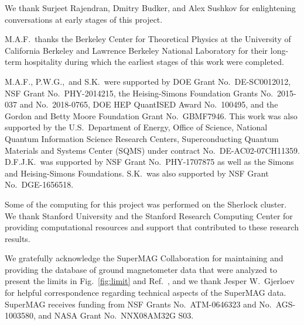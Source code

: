 \documentclass[amsmath,amssymb,aps,10pt,prd,letterpaper,nofootinbib,balancelastpage,notitlepage,superscriptaddress,twocolumn,floatfix]{revtex4-2}
\newcommand{\figref}[2][]{Fig{#1}.~\ref{#2}}		%
\newcommand{\citeR}[2][]{Ref{#1}.~\cite{#2}}		%
\begin{document}
We thank Surjeet Rajendran, Dmitry Budker, and Alex Sushkov for enlightening conversations at early stages of this project.

M.A.F.~thanks the Berkeley Center for Theoretical Physics at the University of California Berkeley and Lawrence Berkeley National Laboratory for their long-term hospitality during which the earliest stages of this work were completed. 

M.A.F., P.W.G.,~and S.K.~were supported by DOE Grant No.~DE-SC0012012, NSF Grant No.~PHY-2014215, the Heising-Simons Foundation Grants No.~2015-037 and No.~2018-0765, DOE HEP QuantISED Award No.~100495, and the Gordon and Betty Moore Foundation Grant No.~GBMF7946.
This work was also supported by the U.S.~Department of Energy, Office of Science, National Quantum Information Science Research Centers, Superconducting Quantum Materials and Systems Center (SQMS) under contract No.~DE-AC02-07CH11359.
D.F.J.K.~was supported by NSF Grant No.~PHY-1707875 as well as the Simons and Heising-Simons Foundations. 
S.K.~was also supported by NSF Grant No.~DGE-1656518.

Some of the computing for this project was performed on the Sherlock cluster. 
We thank Stanford University and the Stanford Research Computing Center for providing computational resources and support that contributed to these research results.

We gratefully acknowledge the SuperMAG Collaboration for maintaining and providing the database of ground magnetometer data that were analyzed to present the limits in \figref{fig:limit} and \citeR{Fedderke:2021qva}, and we thank Jesper W.~Gjerloev for helpful correspondence regarding technical aspects of the SuperMAG data.
SuperMAG receives funding from NSF Grants No.~ATM-0646323 and No.~AGS-1003580, and NASA Grant No.~NNX08AM32G S03.
\end{document}
